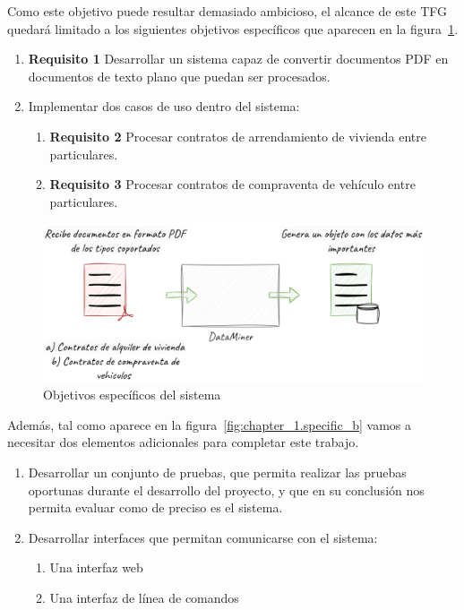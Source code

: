 Como este objetivo puede resultar demasiado ambicioso, el alcance de este TFG quedará limitado a los siguientes
objetivos específicos que aparecen en la figura~\ref{fig:chapter_1.specific_a}.

\begin{enumerate}
    \item \textbf{Requisito 1} Desarrollar un sistema capaz de convertir documentos PDF en documentos de texto
    plano que puedan ser procesados.
    \item Implementar dos casos de uso dentro del sistema:
    \begin{enumerate}
        \item \textbf{Requisito 2} Procesar contratos de arrendamiento de vivienda entre
        particulares\label{req:residence_lease_agreement}.
        \item \textbf{Requisito 3} Procesar contratos de compraventa de vehículo entre
        particulares\label{req:sale_and_purchase_agreement}.
    \end{enumerate}
\end{enumerate}

\begin{figure}[ht]
    \begin{center}
        \includegraphics[width=\textwidth]{chapter/1/images/chapter_1.specific_a}
        \caption{Objetivos específicos del sistema}
        \label{fig:chapter_1.specific_a}
    \end{center}
\end{figure}

Además, tal como aparece en la figura~\ref{fig:chapter_1.specific_b} vamos a necesitar dos elementos adicionales para
completar este trabajo.

\begin{enumerate}
    \item Desarrollar un conjunto de pruebas, que permita realizar las pruebas oportunas durante el desarrollo del
    proyecto, y que en su conclusión nos permita evaluar como de preciso es el sistema.
    \item Desarrollar interfaces que permitan comunicarse con el sistema:
    \begin{enumerate}
        \item  Una interfaz web
        \item  Una interfaz de línea de comandos
    \end{enumerate}
\end{enumerate}

